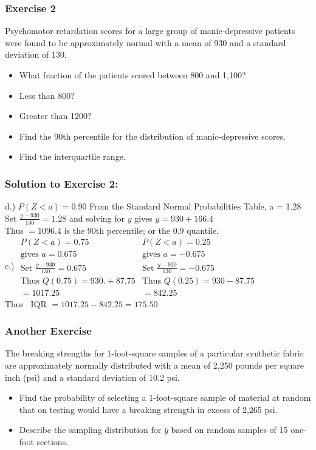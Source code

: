\documentclass[xcolor=dvipsnames,12pt]{beamer}
\begin{document}
\begin{frame}
\frametitle{Exercise 2}
Psychomotor retardation scores for a large group of
manic-depressive patients were found to be approximately normal
with a mean of 930 and a standard deviation of 130.
\begin{itemize}
\item[a)] What fraction of the patients scored between
800 and 1,100? 
\item[b)]Less than 800? 
\item[c)] Greater than 1200?
\item[d)] Find the 90th percentile for the distribution of
          manic-depressive scores. 
\item[e)] Find the interquartile range.
\end{itemize}
\end{frame}



\begin{frame}
\frametitle{Solution to Exercise 2: }
d.) $P(Z < a) = 0.90$ From the Standard Normal Probabilities Table,  a = 1.28 \\[.1in]
 Set $\frac{y - 930}{130} = 1.28$ and solving for $y$ gives $y = 930 + 166.4$\\
  Thus $= 1096.4$ is the 90th percentile; or the 0.9 quantile.\\[.1in]
 e.)
$\begin{array}{l|l}
            P(Z < a) = 0.75 & P(Z < a) = 0.25\\
            \mbox{gives } a = 0.675 & \mbox{gives } a = -0.675\\[.1in]
            \mbox{Set } \frac{y-930}{130} = 0.675 & \mbox{Set } \frac{y-930}{130} = -0.675\\[.1in]
            \mbox{Thus } Q(0.75) = 930. + 87.75 & \mbox{Thus } Q(0.25)= 930 -87.75  \\
            = 1017.25 & = 842.25
            \end{array}$ \\[.2in]          
            \hspace*{1in} \mbox{Thus } IQR $ = 1017.25- 842.25 = 175.50$       
\end{frame}


\begin{frame}
\frametitle{Another Exercise}
The breaking strengths for 1-foot-square
        samples of a particular synthetic fabric are approximately
        normally distributed with a mean of 2,250 pounds per
        square inch (psi) and a standard deviation of 10.2 psi.\\
\begin{itemize}
\item[a.] Find the probability of selecting a 1-foot-square sample
          of material at random that on testing would have a
          breaking strength in excess of 2,265 psi.
\item[b.] Describe the sampling distribution for $\bar{y}$ based
          on random samples of 15 one-foot sections.
\end{itemize}
\end{frame}
\end{document}
